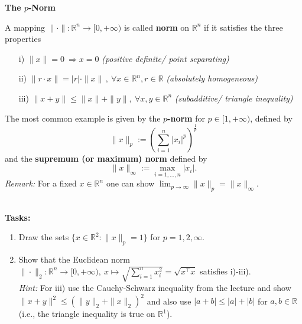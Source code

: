 \textbf{The $p$-Norm}

{\color{navy}
A mapping $\|\cdot\|: \mathbb{R}^n  \to [0,+\infty)$ is called \textbf{norm} on $\mathbb{R}^n$ if it satisfies the three properties
\begin{itemize}
\item[i)] $\|x\|=0\ \Rightarrow x=0$ \hspace{3cm}\textit{(positive definite/ point separating)}
\item[ii)] $\|r\cdot x\|=|r|\cdot \|x\|\, ,\ \forall x\in\mathbb{R}^n, r\in\mathbb{R}$ \hspace{0.43cm}\textit{(absolutely homogeneous)}
\item[iii)] $\|x+y\|\le \|x\|+\|y\|, \ \forall x,y\in\mathbb{R}^n$ \hspace{0.44cm}\textit{(subadditive/ triangle inequality)}
\end{itemize}
The most common example is given by the \textbf{$p$-norm} for $p \in [1,+\infty)$, defined by
$$\|x\|_p := \left(\sum_{i=1}^n |x_i|^p\right)^\frac{1}{p}\nonumber$$
and the \textbf{supremum (or maximum) norm} defined by
$$\|x\|_\infty := \max_{i= 1,\ldots, n} |x_i|.\nonumber$$
\textit{Remark:} For a fixed $x\in\mathbb{R}^n$ one can show $\lim_{p \to \infty} \|x\|_p = \|x\|_\infty$.\\
}
~\\
\textbf{Tasks:}\\
\begin{enumerate}
\item Draw the sets $\{x \in \mathbb{R}^2: \|x\|_p = 1 \}$ for $p = 1,2,\infty.$
\item Show that the Euclidean norm $\|\cdot\|_2: \mathbb{R}^n  \to [0,+\infty),~ x \mapsto \sqrt{\sum_{i=1}^n x_i^2} = \sqrt{x^\top x}$ satisfies i)-iii).\\
\textit{Hint: } For iii) use the Cauchy-Schwarz inequality from the lecture and show $\|x+y\|^2 \leq (\|y\|_2 + \|x\|_2)^2$ and also use  $|a+b| \leq |a| + |b|$ for $a,b\in\mathbb{R}$ (i.e., the triangle inequality is true on $\mathbb{R}^1$).

\end{enumerate}
